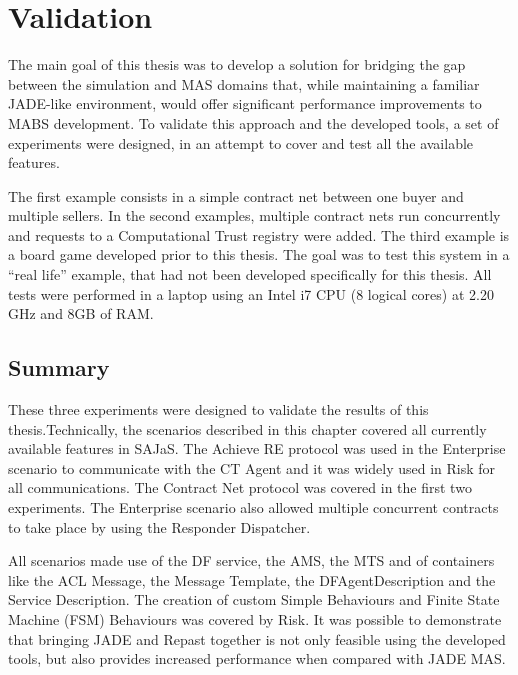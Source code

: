 \chapter{Validation}
\label{chap:validation}

The main goal of this thesis was to develop a solution for bridging the gap between the simulation and MAS domains that, while maintaining a familiar JADE-like environment, would offer significant performance improvements to MABS development. To validate this approach and the developed tools, a set of experiments were designed, in an attempt to cover and test all the available features.

The first example consists in a simple contract net between one buyer and multiple sellers. In the second examples, multiple contract nets run concurrently and requests to a Computational Trust registry were added. The third example is a board game developed prior to this thesis. The goal was to test this system in a ``real life'' example, that had not been developed specifically for this thesis. All tests were performed in a laptop using an Intel i7 CPU (8 logical cores) at 2.20 GHz and 8GB of RAM.








\section{Summary}

These three experiments were designed to validate the results of this thesis.Technically, the scenarios described in this chapter covered all currently available features in SAJaS. The Achieve RE protocol was used in the Enterprise scenario to communicate with the CT Agent and it was widely used in Risk for all communications. The Contract Net protocol was covered in the first two experiments. The Enterprise scenario also allowed multiple concurrent contracts to take place by using the Responder Dispatcher.

All scenarios made use of the DF service, the AMS, the MTS and of containers like the ACL Message, the Message Template, the DFAgentDescription and the Service Description. The creation of custom Simple Behaviours and Finite State Machine (FSM) Behaviours was covered by Risk. It was possible to demonstrate that bringing JADE and Repast together is not only feasible using the developed tools, but also provides increased performance when compared with JADE MAS.


